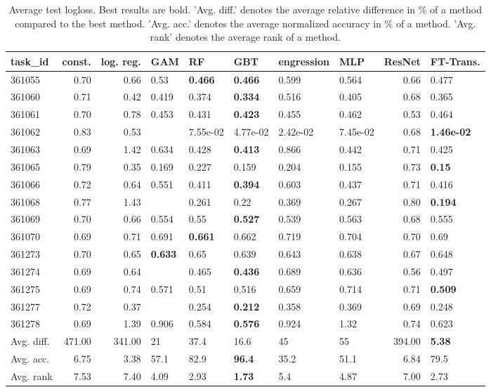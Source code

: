 \begin{table}[ht!]
\centering
\begingroup\footnotesize
\begin{tabular}{lrrlllllrl}
  \hline
\hline
task\_id & const. & log. reg. & GAM & RF & GBT & engression & MLP & ResNet & FT-Trans. \\ 
  \hline
361055 & 0.70 & 0.66 & 0.53 & \textbf{0.466} & \textbf{0.466} & 0.599 & 0.564 & 0.66 & 0.477 \\ 
  361060 & 0.71 & 0.42 & 0.419 & 0.374 & \textbf{0.334} & 0.516 & 0.405 & 0.68 & 0.365 \\ 
  361061 & 0.70 & 0.78 & 0.453 & 0.431 & \textbf{0.423} & 0.455 & 0.462 & 0.53 & 0.464 \\ 
  361062 & 0.83 & 0.53 &  & 7.55e-02 & 4.77e-02 & 2.42e-02 & 7.45e-02 & 0.68 & \textbf{1.46e-02} \\ 
  361063 & 0.69 & 1.42 & 0.634 & 0.428 & \textbf{0.413} & 0.866 & 0.442 & 0.71 & 0.425 \\ 
  361065 & 0.79 & 0.35 & 0.169 & 0.227 & 0.159 & 0.204 & 0.155 & 0.73 & \textbf{0.15} \\ 
  361066 & 0.72 & 0.64 & 0.551 & 0.411 & \textbf{0.394} & 0.603 & 0.437 & 0.71 & 0.416 \\ 
  361068 & 0.77 & 1.43 &  & 0.261 & 0.22 & 0.369 & 0.267 & 0.80 & \textbf{0.194} \\ 
  361069 & 0.70 & 0.66 & 0.554 & 0.55 & \textbf{0.527} & 0.539 & 0.563 & 0.68 & 0.555 \\ 
  361070 & 0.69 & 0.71 & 0.691 & \textbf{0.661} & 0.662 & 0.719 & 0.704 & 0.70 & 0.69 \\ 
  361273 & 0.70 & 0.65 & \textbf{0.633} & 0.65 & 0.639 & 0.643 & 0.638 & 0.67 & 0.648 \\ 
  361274 & 0.69 & 0.64 &  & 0.465 & \textbf{0.436} & 0.689 & 0.636 & 0.56 & 0.497 \\ 
  361275 & 0.69 & 0.74 & 0.571 & 0.51 & 0.516 & 0.659 & 0.714 & 0.71 & \textbf{0.509} \\ 
  361277 & 0.72 & 0.37 &  & 0.254 & \textbf{0.212} & 0.358 & 0.369 & 0.69 & 0.248 \\ 
  361278 & 0.69 & 1.39 & 0.906 & 0.584 & \textbf{0.576} & 0.924 & 1.32 & 0.74 & 0.623 \\ 
   \hline
Avg. diff. & 471.00 & 341.00 & 21 & 37.4 & 16.6 & 45 & 55 & 394.00 & \textbf{5.38} \\ 
  Avg. acc. & 6.75 & 3.38 & 57.1 & 82.9 & \textbf{96.4} & 35.2 & 51.1 & 6.84 & 79.5 \\ 
  Avg. rank & 7.53 & 7.40 & 4.09 & 2.93 & \textbf{1.73} & 5.4 & 4.87 & 7.00 & 2.73 \\ 
   \hline
\hline
\end{tabular}
\endgroup
\caption{Average test logloss. 
                  Best results are bold. 
                  'Avg. diff.' denotes the average relative difference in \% of a method compared to the best method.
                  'Avg. acc.' denotes the average normalized accuracy in \% of a method.
                  'Avg. rank' denotes the average rank of a method.} 
\label{TABLES/table_results_logloss_clustering}
\end{table}
